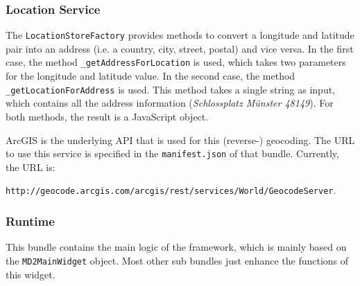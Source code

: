 \subsubsection{Location Service}
The \lstinline|LocationStoreFactory| provides methods to convert a longitude and latitude pair into an address (i.e. a country, city, street, postal) and vice versa. In the first case, the method \lstinline|_getAddressForLocation| is used, which takes two parameters for the longitude and latitude value. In the second case, the method \lstinline|_getLocationForAddress| is used. This method takes a single string as input, which contains all the address information (\eg \textit{Schlossplatz M\"unster 48149}). For both methods, the result is a JavaScript object.

ArcGIS is the underlying API that is used for this (reverse-) geocoding. The URL to use this service is specified in the \lstinline|manifest.json| of that bundle. Currently, the URL is:

 \lstinline|http://geocode.arcgis.com/arcgis/rest/services/World/GeocodeServer|. 

\subsubsection{Runtime}

This bundle contains the main logic of the \MD \mapapps framework, which is mainly based on the \lstinline|MD2MainWidget| object. Most other sub bundles just enhance the functions of this widget.

